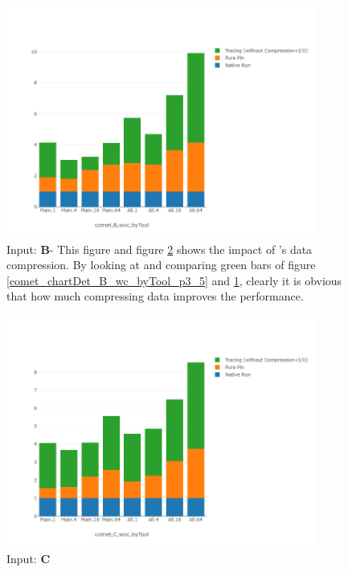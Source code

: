 \begin{figure}[!t]
\centering
\includegraphics[width=4in]{figs.comet/comet_chartDet_B_woc_byTool_p3_5.png}
\caption{ Input: \textbf{B}- This figure and figure \ref{comet_chartDet_C_woc_byTool_p3_5} shows the impact of \parlot 's data compression. By looking at and comparing green bars of figure \ref{comet_chartDet_B_wc_byTool_p3_5} and \ref{comet_chartDet_B_woc_byTool_p3_5}, clearly it is obvious that how much compressing data improves the performance.
}
\label{comet_chartDet_B_woc_byTool_p3_5}
\end{figure}

\begin{figure}[!t]
\centering
\includegraphics[width=4in]{figs.comet/comet_chartDet_C_woc_byTool_p3_5.png}
\caption{ Input: \textbf{C}
}
\label{comet_chartDet_C_woc_byTool_p3_5}
\end{figure}








